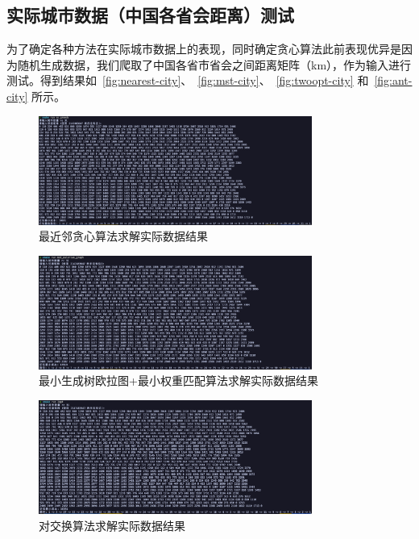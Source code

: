 \subsection{实际城市数据（中国各省会距离）测试}
为了确定各种方法在实际城市数据上的表现，同时确定贪心算法此前表现优异是因为随机生成数据，我们爬取了中国各省市省会之间距离矩阵（km），作为输入进行测试。得到结果如~\autoref{fig:nearest-city}、~\autoref{fig:mst-city}、~\autoref{fig:twoopt-city} 和~\autoref{fig:ant-city} 所示。
\begin{figure}[htbp]
    \centering
    \includegraphics[width=0.8\textwidth]{images/greedy_city.png}
    \caption{最近邻贪心算法求解实际数据结果}
    \label{fig:nearest-city}
\end{figure}
\begin{figure}[htbp]
    \centering
    \includegraphics[width=0.8\textwidth]{images/mst_city.png}
    \caption{最小生成树欧拉图+最小权重匹配算法求解实际数据结果}
    \label{fig:mst-city}
\end{figure}
\begin{figure}[htbp]
    \centering
    \includegraphics[width=0.8\textwidth]{images/2opt_city.png}
    \caption{对交换算法求解实际数据结果}
    \label{fig:twoopt-city}
\end{figure}
